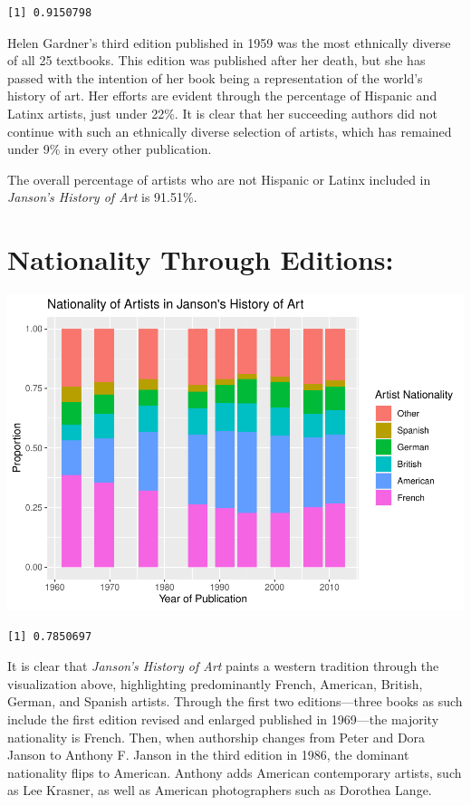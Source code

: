 \documentclass[
  letterpaper,
  DIV=11,
  numbers=noendperiod]{scrreprt}
\begin{document}
\begin{verbatim}
[1] 0.9150798
\end{verbatim}

Helen Gardner's third edition published in 1959 was the most ethnically
diverse of all 25 textbooks. This edition was published after her death,
but she has passed with the intention of her book being a representation
of the world's history of art. Her efforts are evident through the
percentage of Hispanic and Latinx artists, just under 22\%. It is clear
that her succeeding authors did not continue with such an ethnically
diverse selection of artists, which has remained under 9\% in every
other publication.

The overall percentage of artists who are not Hispanic or Latinx
included in \emph{Janson's History of Art} is 91.51\%.

\hypertarget{nationality-through-editions}{%
\section{\texorpdfstring{\textbf{Nationality Through
Editions:}}{Nationality Through Editions:}}\label{nationality-through-editions}}

\includegraphics{Chapter1/Chapter1_files/figure-pdf/jansonnationalitythroughtime-1.pdf}

\begin{verbatim}
[1] 0.7850697
\end{verbatim}

It is clear that \emph{Janson's History of Art} paints a western
tradition through the visualization above, highlighting predominantly
French, American, British, German, and Spanish artists. Through the
first two editions---three books as such include the first edition
revised and enlarged published in 1969---the majority nationality is
French. Then, when authorship changes from Peter and Dora Janson to
Anthony F. Janson in the third edition in 1986, the dominant nationality
flips to American. Anthony adds American contemporary artists, such as
Lee Krasner, as well as American photographers such as Dorothea Lange.
\end{document}

